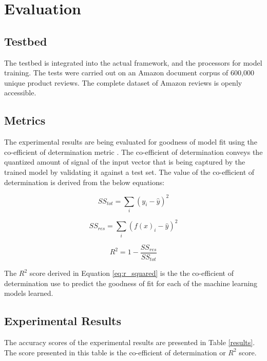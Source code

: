 \documentclass[conference]{IEEEtran}
\begin{document}
\section{Evaluation}

    \subsection{Testbed}
        The testbed is integrated into the actual framework, and the processors for model training.
        The tests were carried out on an Amazon document corpus of 600,000 unique product reviews.
        The complete dataset of Amazon reviews is openly accessible\cite{amazon_datasets}.

    \subsection{Metrics}
        The experimental results are being evaluated for goodness of model fit using the co-efficient of determination metric \cite{jaeger1990statistics}.
        The co-efficient of determination conveys the quantized amount of signal of the input vector that is being captured by the trained model by validating it against a test set. 
        The value of the co-efficient of determination is derived from the below equations:

        \begin{equation}
            \displaystyle SS_{tot} = \sum_{i} (y_i - \hat{y})^2
        \end{equation}

        \begin{equation}
            \displaystyle SS_{res} = \sum_{i} (f(x)_i - \hat{y})^2
        \end{equation}

        \begin{equation} \label{eq:r_squared}
            \displaystyle R^2 = 1 - \frac{SS_{res}}{SS_{tot}}
        \end{equation}

        The $R^2$ score derived in Equation \ref{eq:r_squared} is the the co-efficient of determination use to predict the goodness of fit for each of the machine learning models learned.


    \subsection{Experimental Results}
        The accuracy scores of the experimental results are presented in Table \ref{results}. The score presented in this table is the co-efficient of determination or $R^2$ score.
\end{document}
